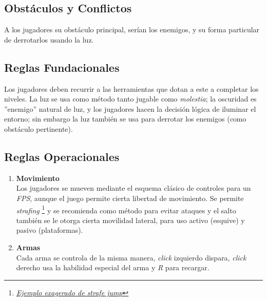 \begin{multicols}{2}
        \subsection{Obstáculos y Conflictos}
        A los jugadores su obstáculo principal, serían los enemigos, y su forma particular de derrotarlos usando la luz.
        \subsection{Reglas Fundacionales}
        Los jugadores deben recurrir a las herramientas que dotan a este a completar los niveles. La luz se usa como método tanto jugable como \textit{molestia}; la oscuridad es ''enemigo'' natural de luz, y los jugadores hacen la decisión lógica de iluminar el entorno; sin embargo la luz también se usa para derrotar los enemigos (como obstáculo pertinente).
        \subsection{Reglas Operacionales}
        \begin{enumerate}[label=\alph*)]
            \item \textbf{Movimiento} \\
            Los jugadores se mueven mediante el esquema clásico de controles para un \textit{FPS}, aunque el juego permite cierta libertad de movimiento. Se permite \textit{strafing} \footnote{\href{https://www.youtube.com/watch?v=pUIqVz6qZLc}{\textit{Ejemplo exagerado de strafe jump}}} y se recomienda como método para evitar ataques y el salto también se le otorga cierta movilidad lateral, para uso activo (esquive) y pasivo (plataformas).
            \item \textbf{Armas} \\
            Cada arma se controla de la misma manera, \textit{click} izquierdo dispara, \textit{click} derecho usa la habilidad especial del arma y \textit{R} para recargar.
        \end{enumerate}


\end{multicols}
